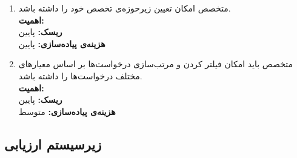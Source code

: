 \begin{enumerate}
		\item
متخصص امکان تعیین زیرحوزه‌ی تخصص خود را داشته باشد.
	\\
	\textbf{اهمیت:} 
	\\
	\textbf{ریسک:} پایین
	\\
	\textbf{هزینه‌ی پیاده‌سازی:} پایین
	\item
متخصص باید امکان فیلتر کردن و مرتب‌سازی درخواست‌ها بر اساس معیارهای مختلف درخواست‌ها را داشته باشد.
	\\
	\textbf{اهمیت:} 
	\\
	\textbf{ریسک:} پایین
	\\
	\textbf{هزینه‌ی پیاده‌سازی:} متوسط
	
\end{enumerate}


\subsection{زیرسیستم ارزیابی}
